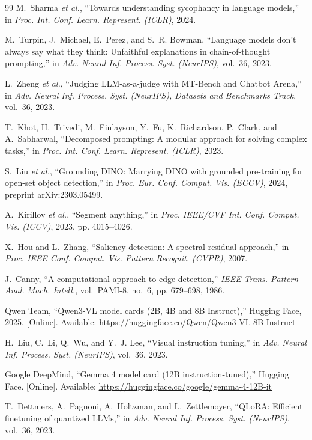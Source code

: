 \documentclass[conference]{IEEEtran}
\begin{document}
\begin{thebibliography}{99}
M.~Sharma \emph{et al.}, ``Towards understanding sycophancy in language models,'' in \emph{Proc. Int.
Conf. Learn. Represent. (ICLR)}, 2024.

M.~Turpin, J.~Michael, E.~Perez, and S.~R. Bowman, ``Language models don't always say what they think:
Unfaithful explanations in chain-of-thought prompting,'' in \emph{Adv. Neural Inf. Process. Syst.
(NeurIPS)}, vol.~36, 2023.

L.~Zheng \emph{et al.}, ``Judging {LLM}-as-a-judge with {MT-Bench} and {Chatbot Arena},'' in \emph{Adv.
Neural Inf. Process. Syst. (NeurIPS), Datasets and Benchmarks Track}, vol.~36, 2023.

T.~Khot, H.~Trivedi, M.~Finlayson, Y.~Fu, K.~Richardson, P.~Clark, and A.~Sabharwal, ``Decomposed
prompting: A modular approach for solving complex tasks,'' in \emph{Proc. Int. Conf. Learn. Represent.
(ICLR)}, 2023.

S.~Liu \emph{et al.}, ``Grounding {DINO}: Marrying {DINO} with grounded pre-training for open-set
object detection,'' in \emph{Proc. Eur. Conf. Comput. Vis. (ECCV)}, 2024, preprint arXiv:2303.05499.

A.~Kirillov \emph{et al.}, ``Segment anything,'' in \emph{Proc. IEEE/CVF Int. Conf. Comput. Vis.
(ICCV)}, 2023, pp. 4015--4026.

X.~Hou and L.~Zhang, ``Saliency detection: A spectral residual approach,'' in \emph{Proc. IEEE Conf.
Comput. Vis. Pattern Recognit. (CVPR)}, 2007.

J.~Canny, ``A computational approach to edge detection,'' \emph{IEEE Trans. Pattern Anal. Mach.
Intell.}, vol.~PAMI-8, no.~6, pp. 679--698, 1986.

Qwen Team, ``{Qwen3-VL} model cards (2B, 4B and 8B Instruct),'' Hugging Face, 2025. [Online]. Available:
\url{https://huggingface.co/Qwen/Qwen3-VL-8B-Instruct}

H.~Liu, C.~Li, Q.~Wu, and Y.~J. Lee, ``Visual instruction tuning,'' in \emph{Adv. Neural Inf.
Process. Syst. (NeurIPS)}, vol.~36, 2023.

Google DeepMind, ``Gemma 4 model card (12B instruction-tuned),'' Hugging Face. [Online]. Available:
\url{https://huggingface.co/google/gemma-4-12B-it}

T.~Dettmers, A.~Pagnoni, A.~Holtzman, and L.~Zettlemoyer, ``{QLoRA}: Efficient finetuning of
quantized {LLMs},'' in \emph{Adv. Neural Inf. Process. Syst. (NeurIPS)}, vol.~36, 2023.


\end{thebibliography}
\end{document}
